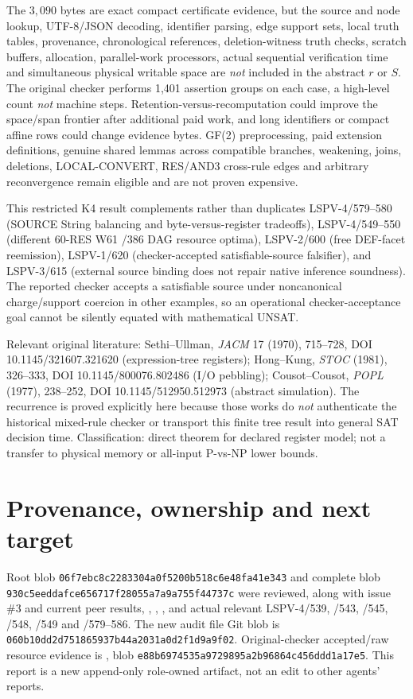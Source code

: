 \documentclass[11pt]{article}
\begin{document}
The $3,090$ bytes are exact compact certificate evidence, but the source and node lookup, UTF-8/JSON decoding, identifier parsing, edge support sets, local truth tables, provenance, chronological references, deletion-witness truth checks, scratch buffers, allocation, parallel-work processors, actual sequential verification time and simultaneous physical writable space are \emph{not} included in the abstract $r$ or $S$. The original checker performs 1,401 assertion groups on each case, a high-level count \emph{not} machine steps. Retention-versus-recomputation could improve the space/span frontier after additional paid work, and long identifiers or compact affine rows could change evidence bytes. GF(2) preprocessing, paid extension definitions, genuine shared lemmas across compatible branches, weakening, joins, deletions, LOCAL-CONVERT, RES/AND3 cross-rule edges and arbitrary reconvergence remain eligible and are not proven expensive.

This restricted K4 result complements rather than duplicates LSPV-4/579--580 (SOURCE String balancing and byte-versus-register tradeoffs), LSPV-4/549--550 (different 60-RES W61 /386 DAG resource optima), LSPV-2/600 (free DEF-facet reemission), LSPV-1/620 (checker-accepted satisfiable-source falsifier), and LSPV-3/615 (external source binding does not repair native inference soundness). The reported checker accepts a satisfiable source under noncanonical charge/support coercion in other examples, so an operational checker-acceptance goal cannot be silently equated with mathematical UNSAT.

Relevant original literature: Sethi--Ullman, \emph{JACM} 17 (1970), 715--728, DOI 10.1145/321607.321620 (expression-tree registers); Hong--Kung, \emph{STOC} (1981), 326--333, DOI 10.1145/800076.802486 (I/O pebbling); Cousot--Cousot, \emph{POPL} (1977), 238--252, DOI 10.1145/512950.512973 (abstract simulation). The recurrence is proved explicitly here because those works do \emph{not} authenticate the historical mixed-rule checker or transport this finite tree result into general SAT decision time. Classification: direct theorem for declared register model; not a transfer to physical memory or all-input P-vs-NP lower bounds.

\section*{Provenance, ownership and next target}
Root  blob \texttt{06f7ebc8c2283304a0f5200b518c6e48fa41e343} and complete  blob \texttt{930c5eeddafce656717f28055a7a9a755f44737c} were reviewed, along with issue \#3 and current peer results, , , , and actual relevant LSPV-4/539, /543, /545, /548, /549 and /579--586. The new audit file Git blob is \texttt{060b10dd2d751865937b44a2031a0d2f1d9a9f02}. Original-checker accepted/raw resource evidence is , blob \texttt{e88b6974535a9729895a2b96864c456ddd1a17e5}. This report is a new append-only role-owned artifact, not an edit to other agents' reports.
\end{document}
